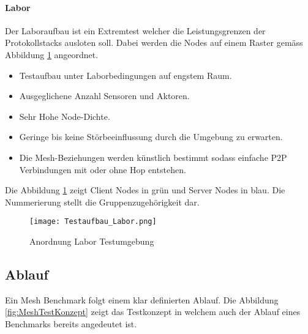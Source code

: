 \paragraph{Labor}
Der Laboraufbau ist ein Extremtest welcher die Leistungsgrenzen der Protokollstacks ausloten soll. Dabei werden die Nodes auf einem Raster gemäss Abbildung \ref{fig:AnordnungLaborTestumgebung} angeordnet.
\begin{itemize}
	\item Testaufbau unter Laborbedingungen auf engstem Raum.
	\item Ausgeglichene Anzahl Sensoren und Aktoren.
	\item Sehr Hohe Node-Dichte.
	\item Geringe bis keine Störbeeinflussung durch die Umgebung zu  erwarten.
	\item Die Mesh-Beziehungen werden künstlich bestimmt sodass einfache P2P Verbindungen mit oder ohne Hop entstehen.
\end{itemize}

Die Abbildung \ref{fig:AnordnungLaborTestumgebung} zeigt Client Nodes in grün und Server Nodes in blau. Die Nummerierung stellt die Gruppenzugehörigkeit dar. 

\begin{figure}[H]
\centering
\texttt{[image: Testaufbau\_Labor.png]}
\caption{Anordnung Labor Testumgebung}\label{fig:AnordnungLaborTestumgebung}
\end{figure}
	



\subsection{Ablauf}\label{subsec:AblaufMesh}

Ein Mesh Benchmark folgt einem klar definierten Ablauf. Die Abbildung \ref{fig:MeshTestKonzept} zeigt das Testkonzept in welchem auch der Ablauf eines Benchmarks bereits angedeutet ist.


